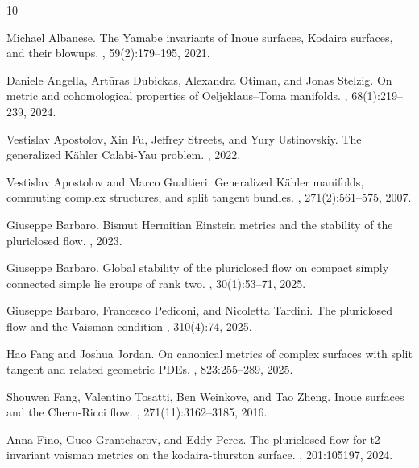 \documentclass[12pt]{amsart}
\numberwithin{equation}{section}
\numberwithin{prop}{section}
\theoremstyle{definition}
\begin{document}
%
%

\begin{thebibliography}{10}

Michael Albanese.
\newblock The {Y}amabe invariants of {I}noue surfaces, {K}odaira surfaces, and their blowups.
, 59(2):179--195, 2021.

Daniele Angella, Art{\=u}ras Dubickas, Alexandra Otiman, and Jonas Stelzig.
\newblock On metric and cohomological properties of Oeljeklaus--Toma manifolds.
, 68(1):219--239, 2024.

Vestislav Apostolov, Xin Fu, Jeffrey Streets, and Yury Ustinovskiy.
\newblock The generalized K\"ahler Calabi-Yau problem.
, 2022.

Vestislav Apostolov and Marco Gualtieri.
\newblock Generalized {K}\"ahler manifolds, commuting complex structures, and split tangent bundles.
, 271(2):561--575, 2007.

Giuseppe Barbaro.
\newblock Bismut Hermitian Einstein metrics and the stability of the pluriclosed flow.
, 2023.

Giuseppe Barbaro.
\newblock Global stability of the pluriclosed flow on compact simply connected simple lie groups of rank two.
, 30(1):53--71, 2025.

Giuseppe Barbaro, Francesco Pediconi, and Nicoletta Tardini.
\newblock The pluriclosed flow and the Vaisman condition 
, 310(4):74, 2025.

Hao Fang and Joshua Jordan.
\newblock On canonical metrics of complex surfaces with split tangent and related geometric {PDE}s.
, 823:255--289, 2025.

Shouwen Fang, Valentino Tosatti, Ben Weinkove, and Tao Zheng.
\newblock Inoue surfaces and the {C}hern-{R}icci flow.
, 271(11):3162--3185, 2016.

Anna Fino, Gueo Grantcharov, and Eddy Perez.
\newblock The pluriclosed flow for t2-invariant vaisman metrics on the kodaira-thurston surface.
, 201:105197, 2024.


\end{thebibliography}
\end{document}
